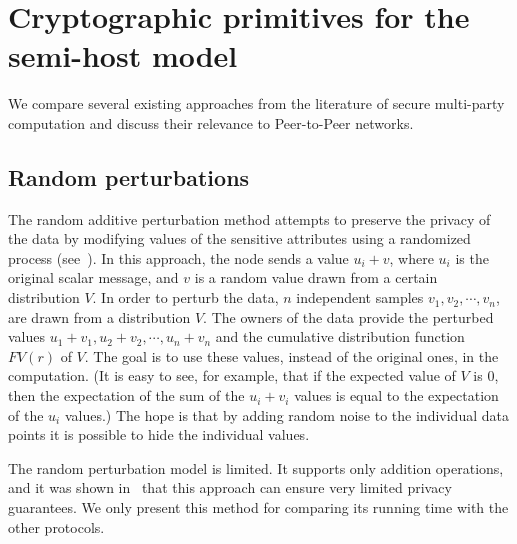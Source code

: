 \documentclass[10pt]{svjour3}
\begin{document}
\section{Cryptographic primitives for the semi-host model}
\label{crypto} We compare several existing approaches from the
literature of secure multi-party computation and discuss their
relevance to Peer-to-Peer networks.

\subsection{Random perturbations}
The random additive perturbation method attempts to preserve the
privacy of the data by modifying values of the sensitive
attributes using a randomized process
(see~\cite{AS,DiNi,RandomNoise}). In this approach, the node sends
a value $u_i + v$, where $u_i$ is the original scalar message, and
$v$ is a random value drawn from a certain distribution $V$. In
order to perturb the data, $n$ independent samples $v_1, v_2,
\cdots , v_n$, are drawn from a distribution $V$. The owners of
the data provide the perturbed values $u_1+v_1, u_2+v_2, \cdots ,
u_n+v_n$ and the cumulative distribution function $FV(r)$ of $V$.
The goal is to use these values, instead of the original ones, in
the computation. (It is easy to see, for example, that if the
expected value of $V$ is $0$, then the expectation of the sum of
the $u_i+v_i$ values is equal to the expectation of the $u_i$
values.) The hope is that by adding random noise to the individual
data points it is possible to hide the individual values.



The random perturbation model is limited. It supports only
addition operations, and it was shown in~\cite{DiNi} that this
approach can ensure very limited privacy guarantees. We only
present
this method
for
comparing its running time with the other protocols.
\end{document}
